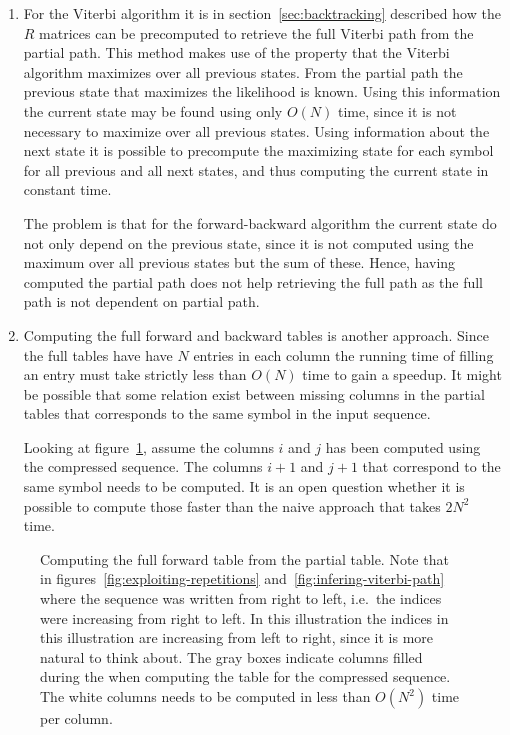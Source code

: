 \begin{enumerate}
\item For the Viterbi algorithm it is in section~\ref{sec:backtracking}
  described how the $R$ matrices can be precomputed to retrieve the full
  Viterbi path from the partial path. This method makes use of the property
  that the Viterbi algorithm maximizes over all previous states. From the
  partial path the previous state that maximizes the likelihood is known. Using
  this information the current state may be found using only $O(N)$ time, since
  it is not necessary to maximize over all previous states. Using information
  about the next state it is possible to precompute the maximizing state for
  each symbol for all previous and all next states, and thus computing the
  current state in constant time.

  The problem is that for the forward-backward algorithm the current state do
  not only depend on the previous state, since it is not computed using the
  maximum over all previous states but the sum of these. Hence, having computed
  the partial path does not help retrieving the full path as the full path is
  not dependent on partial path.
\item Computing the full forward and backward tables is another approach. Since
  the full tables have have $N$ entries in each column the running time of
  filling an entry must take strictly less than $O(N)$ time to gain a
  speedup. It might be possible that some relation exist between missing
  columns in the partial tables that corresponds to the same symbol in the
  input sequence.

  Looking at figure~\ref{fig:full-forward-table}, assume the columns $i$ and
  $j$ has been computed using the compressed sequence. The columns $i + 1$ and
  $j + 1$  that correspond to the same symbol needs to be computed. It is an
  open question whether it is possible to compute those faster than the naive
  approach that takes $2N^2$ time.
\end{enumerate}

\begin{figure}
  \centering
  
  \caption{Computing the full forward table from the partial table. Note that
    in figures~\ref{fig:exploiting-repetitions}
    and~\ref{fig:infering-viterbi-path} where the sequence was written from
    right to left, i.e.\ the indices were increasing from right to left. In
    this illustration the indices in this illustration are increasing from
    left to right, since it is more natural to think about. The gray boxes
    indicate columns filled during the when computing the table for the
    compressed sequence. The white columns needs to be computed in less than
    $O(N^2)$ time per column.}
  \label{fig:full-forward-table}
\end{figure}

